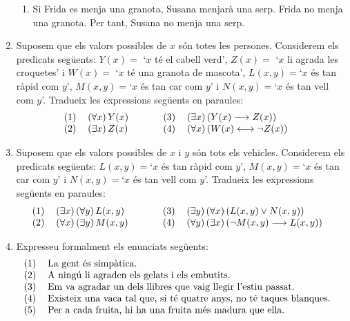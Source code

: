 \begin{enumerate}
\begin{enumerate}
\item Si Frida es menja una granota, Susana menjar\`{a} una serp. Frida no
menja una granota. Per tant, Susana no menja una serp.
\end{enumerate}

\item Suposem que els valors possibles de $x$ s\'{o}n totes les persones.
Considerem els predicats seg\"{u}ents: $Y(x)=$ `$x$ t\'{e} el cabell verd',
$Z(x)=$ `$x$ li agrada les croquetes' i $W(x)=$ `$x$ t\'{e} una granota de
mascota', $L(x,y)=$`$x$ \'{e}s tan r\`{a}pid com $y$', $M(x,y)=$`$x$ \'{e}s
tan car com $y$' i $N(x,y)=$`$x$ \'{e}s tan vell com $y$'. Tradueix les
expressions seg\"{u}ents en paraules:%
\[%
\begin{tabular}
[c]{llllll}%
(1) & $\left(  \forall x\right)  Y(x)$ &  &  & (3) & $\left(  \exists
x\right)  \left(  Y(x)\longrightarrow Z(x)\right)  $\\
(2) & $\left(  \exists x\right)  Z(x)$ &  &  & (4) & $\left(  \forall
x\right)  \left(  W(x)\longleftrightarrow\lnot Z(x)\right)  $%
\end{tabular}
\ \ \ \
\]


\item Suposem que els valors possibles de $x$ i $y$ s\'{o}n tots els vehicles.
Considerem els predicats seg\"{u}ents: $L(x,y)=$`$x$ \'{e}s tan r\`{a}pid com
$y$', $M(x,y)=$`$x$ \'{e}s tan car com $y$' i $N(x,y)=$`$x$ \'{e}s tan vell
com $y$'. Tradueix les expressions seg\"{u}ents en paraules:%
\[%
\begin{tabular}
[c]{llllll}%
(1) & $\left(  \exists x\right)  \left(  \forall y\right)  L(x,y)$ &  &  &
(3) & $\left(  \exists y\right)  \left(  \forall x\right)  \left(  L(x,y)\vee
N(x,y)\right)  $\\
(2) & $\left(  \forall x\right)  \left(  \exists y\right)  M(x,y)$ &  &  &
(4) & $\left(  \forall y\right)  \left(  \exists x\right)  \left(  \lnot
M(x,y)\longrightarrow L(x,y)\right)  $%
\end{tabular}
\ \ \
\]


\item Expresseu formalment els enunciats seg\"{u}ents:%
\[%
\begin{tabular}
[c]{ll}%
(1) & La gent \'{e}s simp\`{a}tica.\\
(2) & A ning\'{u} li agraden els gelats i els embutits.\\
(3) & Em va agradar un dels llibres que vaig llegir l'estiu passat.\\
(4) & Existeix una vaca tal que, si t\'{e} quatre anys, no t\'{e} taques
blanques.\\
(5) & Per a cada fruita, hi ha una fruita m\'{e}s madura que ella.
\end{tabular}
\ \ \
\]



\end{enumerate}
